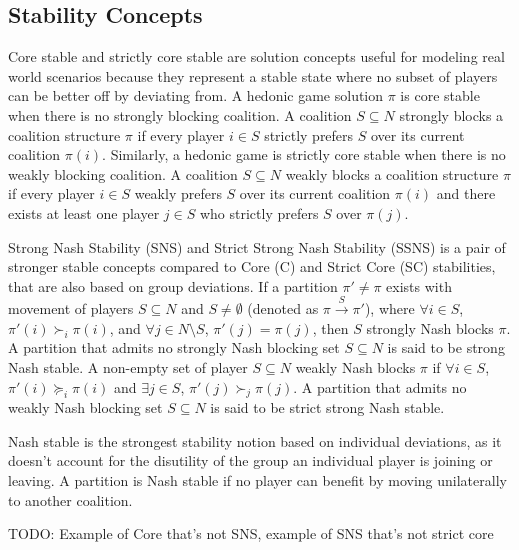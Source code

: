 \documentclass[letterpaper]{article} %
\begin{document}
\subsection{Stability Concepts}
Core stable and strictly core stable are solution concepts useful for modeling real world scenarios because they represent a stable state where no subset of players can be better off by deviating from. A hedonic game solution $\pi$ is core stable when there is no strongly blocking coalition. A coalition $S \subseteq N$ strongly blocks a coalition structure $\pi$ if every player $i \in S$ strictly prefers $S$ over its current coalition $\pi(i)$. Similarly, a hedonic game is strictly core stable when there is no weakly blocking coalition. A coalition $S \subseteq N$ weakly blocks a coalition structure $\pi$ if every player $i \in S$ weakly prefers $S$ over its current coalition $\pi(i)$ and there exists at least one player $j \in S$ who strictly prefers $S$ over $\pi(j)$.

Strong Nash Stability (SNS) and Strict Strong Nash Stability (SSNS) is a pair of stronger stable concepts compared to Core (C) and Strict Core (SC) stabilities, that are also based on group deviations. If a partition $\pi' \neq \pi$ exists with movement of players $S \subseteq N$ and $S \neq \emptyset$ (denoted as $\pi \xrightarrow{S} \pi'$), where $\forall i \in S$, $\pi'(i) \succ_i \pi(i)$, and $\forall j \in N\text{\textbackslash}S$, $\pi'(j) = \pi(j)$, then $S$ strongly Nash blocks $\pi$. A partition that admits no strongly Nash blocking set $S \subseteq N$ is said to be strong Nash stable. A non-empty set of player $S \subseteq N$ weakly Nash blocks $\pi$ if $\forall i \in S$, $\pi'(i) \succeq_i \pi(i)$ and $\exists j \in S$, $\pi'(j) \succ_j \pi(j)$. A partition that admits no weakly Nash blocking set $S \subseteq N$ is said to be strict strong Nash stable.

Nash stable is the strongest stability notion based on individual deviations, as it doesn't account for the disutility of the group an individual player is joining or leaving. A partition is Nash stable if no player can benefit by moving unilaterally to another coalition.

TODO: Example of Core that's not SNS, example of SNS that's not strict core
\end{document}
